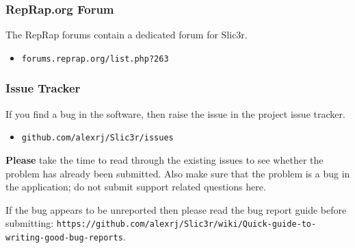 \subsubsection{RepRap.org Forum} %
\label{sub:reprap_org_forum}


The RepRap forums contain a dedicated forum for Slic3r.
\begin{itemize}
    \item \texttt{forums.reprap.org/list.php?263}
\end{itemize}


\subsubsection{Issue Tracker} %
\label{sub:issue_tracker}

If you find a bug in the software, then raise the issue in the project issue tracker.

\begin{itemize}
    \item \texttt{github.com/alexrj/Slic3r/issues}
\end{itemize}

\textbf{Please} take the time to read through the existing issues to see whether the problem has already been submitted.  Also make sure that the problem is a bug in the application; do not submit support related questions here.

If the bug appears to be unreported then please read the bug report guide before submitting: \texttt{https://github.com/alexrj/Slic3r/wiki/Quick-guide-to-writing-good-bug-reports}.


